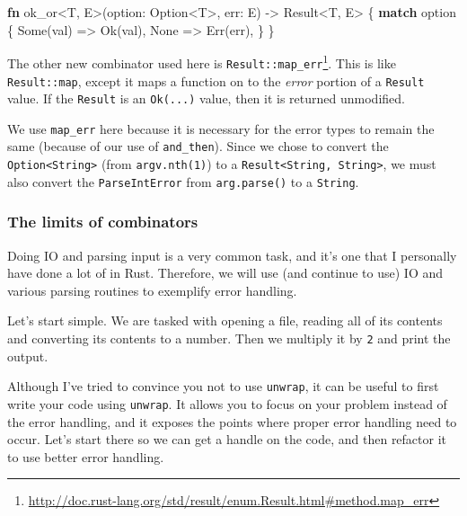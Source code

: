 \documentclass[a4paper,]{book}
\newenvironment{Shaded}{\begin{snugshade}}{\end{snugshade}}
\newcommand{\KeywordTok}[1]{\textcolor[rgb]{0.13,0.29,0.53}{\textbf{{#1}}}}
\newcommand{\DataTypeTok}[1]{\textcolor[rgb]{0.13,0.29,0.53}{{#1}}}
\newcommand{\ConstantTok}[1]{\textcolor[rgb]{0.00,0.00,0.00}{{#1}}}
\newcommand{\NormalTok}[1]{{#1}}
\renewcommand{\href}[2]{#2\footnote{\url{#1}}}
\begin{document}
\begin{Shaded}
\begin{Highlighting}[]
\KeywordTok{fn} \NormalTok{ok_or<T, E>(option: }\DataTypeTok{Option}\NormalTok{<T>, err: E) -> }\DataTypeTok{Result}\NormalTok{<T, E> \{}
    \KeywordTok{match} \NormalTok{option \{}
        \ConstantTok{Some}\NormalTok{(val) => }\ConstantTok{Ok}\NormalTok{(val),}
        \ConstantTok{None} \NormalTok{=> }\ConstantTok{Err}\NormalTok{(err),}
    \NormalTok{\}}
\NormalTok{\}}
\end{Highlighting}
\end{Shaded}

The other new combinator used here is
\href{http://doc.rust-lang.org/std/result/enum.Result.html\#method.map_err}{\texttt{Result::map\_err}}.
This is like \texttt{Result::map}, except it maps a function on to the
\emph{error} portion of a \texttt{Result} value. If the \texttt{Result}
is an \texttt{Ok(...)} value, then it is returned unmodified.

We use \texttt{map\_err} here because it is necessary for the error
types to remain the same (because of our use of \texttt{and\_then}).
Since we chose to convert the
\texttt{Option\textless{}String\textgreater{}} (from
\texttt{argv.nth(1)}) to a
\texttt{Result\textless{}String,\ String\textgreater{}}, we must also
convert the \texttt{ParseIntError} from \texttt{arg.parse()} to a
\texttt{String}.

\hypertarget{the-limits-of-combinators}{\subsubsection{The limits of
combinators}\label{the-limits-of-combinators}}

Doing IO and parsing input is a very common task, and it's one that I
personally have done a lot of in Rust. Therefore, we will use (and
continue to use) IO and various parsing routines to exemplify error
handling.

Let's start simple. We are tasked with opening a file, reading all of
its contents and converting its contents to a number. Then we multiply
it by \texttt{2} and print the output.

Although I've tried to convince you not to use \texttt{unwrap}, it can
be useful to first write your code using \texttt{unwrap}. It allows you
to focus on your problem instead of the error handling, and it exposes
the points where proper error handling need to occur. Let's start there
so we can get a handle on the code, and then refactor it to use better
error handling.
\end{document}
